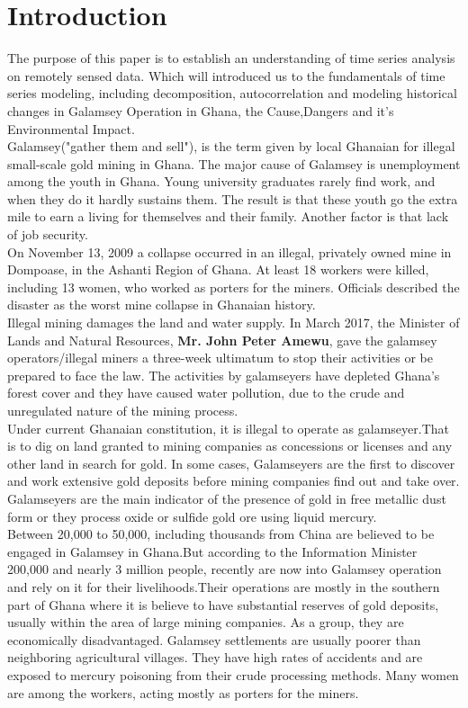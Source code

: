 \documentclass[12pt,a4paper]{article}
\begin{document}
	\section{Introduction}
	The purpose of this paper is to establish an understanding of time series analysis on remotely sensed data. Which will introduced us to the fundamentals of time series modeling, including decomposition, autocorrelation and modeling historical changes in Galamsey Operation in Ghana, the Cause,Dangers and it's Environmental Impact.\\
	Galamsey("gather them and sell")\parencite{OwusuNimo2018}, is the term given by local Ghanaian for illegal small-scale gold mining in Ghana\parencite{DavidYawDanquah2019}.
	The major cause of Galamsey is unemployment among the youth in Ghana\parencite{Gracia2018}. Young university graduates rarely find work, and when they do it hardly sustains them. The result is that these youth go the extra mile to earn a living for themselves and their family. Another factor is that lack of job security.\\
	On November 13, 2009 a collapse occurred in an illegal, privately owned mine in Dompoase, in the Ashanti Region of Ghana. At least 18 workers were killed, including 13 women, who worked as porters for the miners. Officials described the disaster as the worst mine collapse in Ghanaian history\parencite{News2009}.\\
	Illegal mining damages the land and water supply\parencite{Ansah2017}. In March 2017, the Minister of Lands and Natural Resources,\textbf{ Mr. John Peter Amewu}, gave the galamsey operators/illegal miners a three-week ultimatum to stop their activities or be prepared to face the law\parencite{Allotey2017}. The activities by galamseyers have depleted Ghana's forest cover and they have caused water pollution, due to the crude and unregulated nature of the mining process\parencite{Gyekye2021}.\\
    Under current Ghanaian constitution, it is illegal to operate as galamseyer.That is to dig on land granted to mining companies as concessions or licenses and any other land in search for gold. In some cases, Galamseyers are the first to discover and work extensive gold deposits before mining companies find out and take over. Galamseyers are the main indicator of the presence of gold in free metallic dust form or they process oxide or sulfide gold ore using liquid mercury. \\
	Between 20,000 to 50,000, including thousands from China are believed to be engaged in Galamsey in Ghana.But according to the Information Minister  200,000 and nearly 3 million  people, recently are now into Galamsey operation and  rely on it for their livelihoods\parencite{Burrows2017}.Their operations are mostly in the southern part of Ghana where it is believe  to have substantial reserves of gold deposits, usually within the area of  large mining companies\parencite{Barenblitt2021}. As a group, they are economically disadvantaged. Galamsey settlements are usually poorer than neighboring agricultural villages. They have high rates of accidents and are exposed to mercury poisoning from their crude processing methods. Many women are among the workers, acting mostly as porters for the miners.\\
\end{document}
